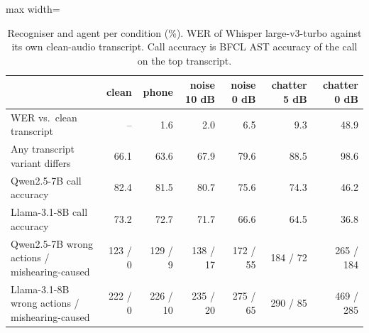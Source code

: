 \begin{table}[t]\centering\small
\begin{adjustbox}{max width=\linewidth}\begin{tabular}{lrrrrrr}\toprule
 & clean & phone & noise 10 dB & noise 0 dB & chatter 5 dB & chatter 0 dB \\ \midrule
WER vs.\ clean transcript & -- & 1.6 & 2.0 & 6.5 & 9.3 & 48.9 \\
Any transcript variant differs & 66.1 & 63.6 & 67.9 & 79.6 & 88.5 & 98.6 \\
Qwen2.5-7B call accuracy & 82.4 & 81.5 & 80.7 & 75.6 & 74.3 & 46.2 \\
Llama-3.1-8B call accuracy & 73.2 & 72.7 & 71.7 & 66.6 & 64.5 & 36.8 \\
Qwen2.5-7B wrong actions / mishearing-caused & 123 / 0 & 129 / 9 & 138 / 17 & 172 / 55 & 184 / 72 & 265 / 184 \\
Llama-3.1-8B wrong actions / mishearing-caused & 222 / 0 & 226 / 10 & 235 / 20 & 275 / 65 & 290 / 85 & 469 / 285 \\
\bottomrule\end{tabular}\end{adjustbox}
\caption{Recogniser and agent per condition (\%). WER of Whisper large-v3-turbo against its own clean-audio transcript. Call accuracy is BFCL AST accuracy of the call on the top transcript.}\label{tab:acc}
\end{table}

